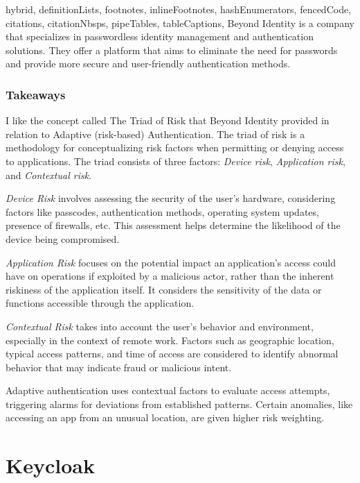 \documentclass[
  digital,     %
  oneside,     %
  nosansbold,  %
  nocolorbold, %
  lof,         %
  lot,         %
]{fithesis4}
\begin{document}
\begin{markdown*}{%
  hybrid,
  definitionLists,
  footnotes,
  inlineFootnotes,
  hashEnumerators,
  fencedCode,
  citations,
  citationNbsps,
  pipeTables,
  tableCaptions,
}
Beyond Identity is a company that specializes in passwordless identity management and authentication solutions. They offer a platform that aims to eliminate the need for passwords and provide more secure and user-friendly authentication methods.

\subsection{Takeaways}
I like the concept called The Triad of Risk that Beyond Identity provided in relation to Adaptive (risk-based) Authentication.
The triad of risk is a methodology for conceptualizing risk factors when permitting or denying access to applications.
The triad consists of three factors: \textit{Device risk}, \textit{Application risk}, and \textit{Contextual risk}.

\textit{Device Risk} involves assessing the security of the user's hardware, considering factors like passcodes, authentication methods, operating system updates, presence of firewalls, etc.
This assessment helps determine the likelihood of the device being compromised.

\textit{Application Risk} focuses on the potential impact an application's access could have on operations if exploited by a malicious actor, rather than the inherent riskiness of the application itself.
It considers the sensitivity of the data or functions accessible through the application.

\textit{Contextual Risk} takes into account the user's behavior and environment, especially in the context of remote work. Factors such as geographic location, typical access patterns, and time of access are considered to identify abnormal behavior that may indicate fraud or malicious intent.

Adaptive authentication uses contextual factors to evaluate access attempts, triggering alarms for deviations from established patterns. Certain anomalies, like accessing an app from an unusual location, are given higher risk weighting. \cite{existing-beyond-identity}



\newpage

\chapter{Keycloak}


\end{markdown*}
\end{document}
